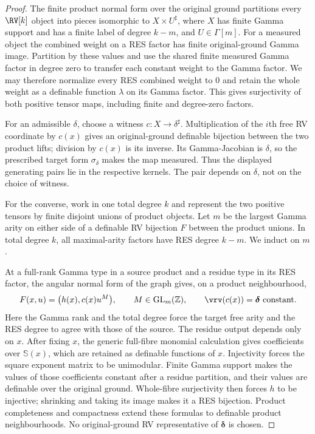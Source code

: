 \begin{proof}
The finite product normal form over the original ground partitions
every $\RV[k]$ object into pieces isomorphic to
$X\times U^\sharp$, where $X$ has finite Gamma support and has a
finite label of degree $k-m$, and $U\in\Gamma[m]$. For a measured
object the combined weight on a RES factor has finite original-ground
Gamma image. Partition by these values and use the shared finite
measured Gamma factor in degree zero to transfer each constant weight
to the Gamma factor. We may therefore normalize every RES combined
weight to $0$ and retain the whole weight as a definable function
$\lambda$ on its Gamma factor. This gives surjectivity of both positive
tensor maps, including finite and degree-zero factors.

For an admissible $\delta$, choose a witness $c:X\to\delta^\sharp$.
Multiplication of the $i$th free RV coordinate by $c(x)$ gives an
original-ground definable bijection between the two product lifts;
division by $c(x)$ is its inverse. Its Gamma-Jacobian is $\delta$,
so the prescribed target form $\sigma_\delta$ makes the map measured.
Thus the displayed generating pairs lie in the respective kernels.
The pair depends on $\delta$, not on the choice of witness.

For the converse, work in one total degree $k$ and represent the two
positive tensors by finite disjoint unions of product objects.
Let $m$ be the largest Gamma arity on either side of a definable
RV bijection $F$ between the product unions. In total degree $k$, all
maximal-arity factors have RES degree $k-m$. We induct on $m$.

At a full-rank Gamma type in a source product and a residue type in
its RES factor, the angular normal form of the graph gives, on a
product neighbourhood,
\[
 F(x,u)=\bigl(h(x),c(x)u^M\bigr),\qquad
 M\in\operatorname{GL}_m(\mathbb Z),\qquad
 \vrv(c(x))=\boldsymbol\delta\text{ constant}.
\]
Here the Gamma rank and the total degree force the target free arity
and the RES degree to agree with those of the source. The residue
output depends only on $x$. After fixing $x$, the generic full-fibre
monomial calculation gives coefficients over $\mathbb S(x)$, which
are retained as definable functions of $x$. Injectivity forces the
square exponent matrix to be unimodular. Finite Gamma support makes
the values of those coefficients constant after a residue partition,
and their values are definable over the original ground. Whole-fibre
surjectivity then forces $h$ to be injective; shrinking and taking its
image makes it a RES bijection. Product completeness and compactness
extend these formulas to definable product neighbourhoods. No
original-ground RV representative of $\boldsymbol\delta$ is chosen.


\end{proof}
